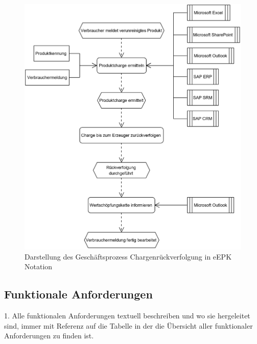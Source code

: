 \begin{figure}[H]
	\centering
	\includegraphics[width=1\linewidth]{pictures/business-process-epc-diagram-bw}
	\caption[Darstellung des Geschäftsprozess Chargenrückverfolgung in eEPK Notation]{Darstellung des Geschäftsprozess Chargenrückverfolgung in eEPK Notation}
	\label{fig:target-business-process}
\end{figure}

\subsection{Funktionale Anforderungen}
1. Alle funktionalen Anforderungen textuell beschreiben und wo sie hergeleitet sind, immer mit Referenz auf die Tabelle in der die Übersicht aller funktionaler Anforderungen zu finden ist.

